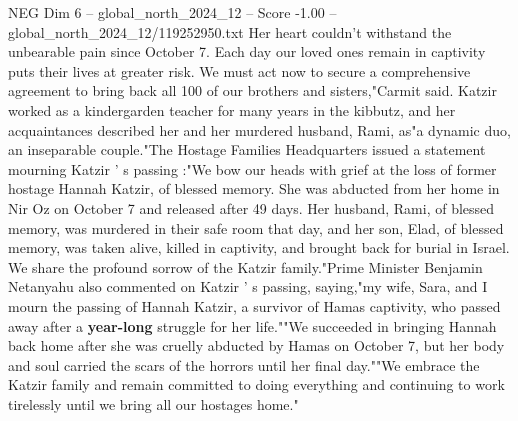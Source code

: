 \begin{textsample}{NEG Dim 6 – global\_north\_2024\_12 – Score -1.00 – global\_north\_2024\_12/119252950.txt}
Her heart couldn't withstand the unbearable pain since October 7.
Each day our loved ones remain in captivity puts their lives at greater risk.
We must act now to secure a comprehensive agreement to bring back all 100 of our brothers and sisters,"Carmit said.
Katzir worked as a kindergarden teacher for many years in the kibbutz, and her acquaintances described her and her murdered husband, Rami, as"a dynamic duo, an inseparable couple."The Hostage Families Headquarters issued a statement mourning Katzir ' s passing :"We bow our heads with grief at the loss of former hostage Hannah Katzir, of blessed memory.
She was abducted from her home in Nir Oz on October 7 and released after 49 days.
Her husband, Rami, of blessed memory, was murdered in their safe room that day, and her son, Elad, of blessed memory, was taken alive, killed in captivity, and brought back for burial in Israel.
We share the profound sorrow of the Katzir family."Prime Minister Benjamin Netanyahu also commented on Katzir ' s passing, saying,"my wife, Sara, and I mourn the passing of Hannah Katzir, a survivor of Hamas captivity, who passed away after a \textbf{year-long} struggle for her life.""We succeeded in bringing Hannah back home after she was cruelly abducted by Hamas on October 7, but her body and soul carried the scars of the horrors until her final day.""We embrace the Katzir family and remain committed to doing everything and continuing to work tirelessly until we bring all our hostages home."

\end{textsample}
